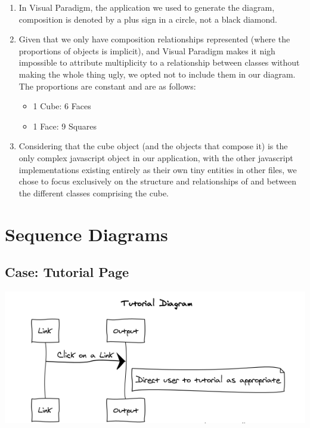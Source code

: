 \documentclass[12pt]{article}
\begin{document}
	\par
	
	\begin{enumerate}
	\item In Visual Paradigm, the application we used to generate the diagram, composition is denoted by a plus sign in a circle, not a black diamond.
	\item Given that we only have composition relationships represented (where the proportions of objects is implicit), and Visual Paradigm makes it nigh impossible to attribute multiplicity to a relationship between classes without making the whole thing ugly, we opted not to include them in our diagram. The proportions are constant and are as follows:
	\begin{itemize}
	\item 1 Cube: 6 Faces
	\item 1 Face: 9 Squares
	\end{itemize}
	\item Considering that the cube object (and the objects that compose it) is the only complex javascript object in our application, with the other javascript implementations existing entirely as their own tiny entities in other files, we chose to focus exclusively on the structure and relationships of and between the different classes comprising the cube.
	\end{enumerate}
	

\section{Sequence Diagrams}
	\subsection{Case: Tutorial Page}
	\includegraphics[width = .5\textwidth]{tut.PNG}
\end{document}
